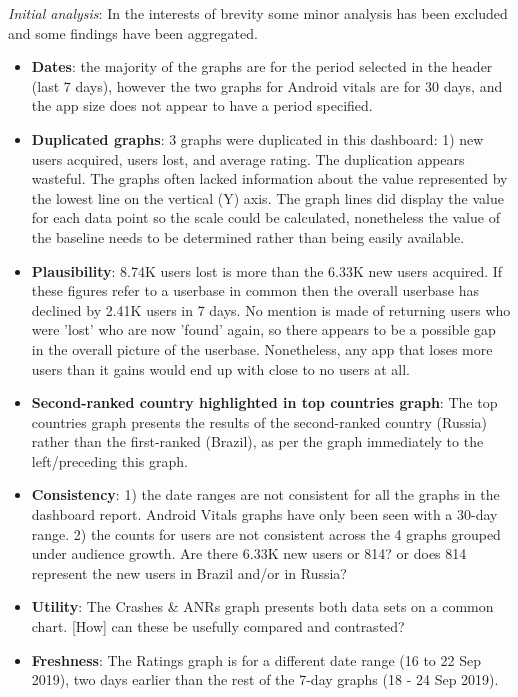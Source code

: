 \textit{Initial analysis}: In the interests of brevity some minor analysis has been excluded and some findings have been aggregated. 

\begin{itemize}
    \item \textbf{Dates}: the majority of the graphs are for the period selected in the header (last 7 days), however the two graphs for Android vitals are for 30 days, and the app size does not appear to have a period specified.
    \item \textbf{Duplicated graphs}: 3 graphs were duplicated in this dashboard: 1) new users acquired, users lost, and average rating. The duplication appears wasteful. The graphs often lacked information about the value represented by the lowest line on the vertical (Y) axis. The graph lines did display the value for each data point so the scale could be calculated, nonetheless the value of the baseline needs to be determined rather than being easily available.
    \item \textbf{Plausibility}: 8.74K users lost is more than the 6.33K new users acquired. If these figures refer to a userbase in common then the overall userbase has declined by 2.41K users in 7 days. No mention is made of returning users who were 'lost' who are now 'found' again, so there appears to be a possible gap in the overall picture of the userbase. Nonetheless, any app that loses more users than it gains would end up with close to no users at all.
    \item \textbf{Second-ranked country highlighted in top countries graph}: The top countries graph presents the results of the second-ranked country (Russia) rather than the first-ranked (Brazil), as per the graph immediately to the left/preceding this graph. 
    \item \textbf{Consistency}: 1) the date ranges are not consistent for all the graphs in the dashboard report. Android Vitals graphs have only been seen with a 30-day range. 2) the counts for users are not consistent across the 4 graphs grouped under audience growth. Are there 6.33K new users or 814? or does 814 represent the new users in Brazil and/or in Russia?
    \item \textbf{Utility}: The Crashes \& ANRs graph presents both data sets on a common chart. [How] can these be usefully compared and contrasted? 
    \item \textbf{Freshness}: The Ratings graph is for a different date range (16 to 22 Sep 2019), two days earlier than the rest of the 7-day graphs (18 - 24 Sep 2019). 
\end{itemize}

